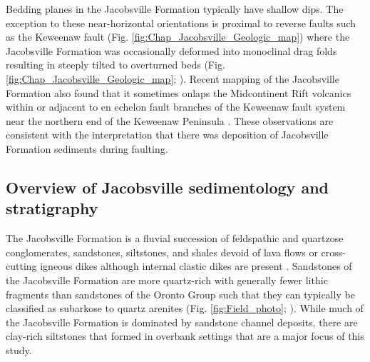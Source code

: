 Bedding planes in the Jacobsville Formation typically have shallow dips. The exception to these near-horizontal orientations is proximal to reverse faults such as the Keweenaw fault (Fig. \ref{fig:Chap_Jacobsville_Geologic_map}) where the Jacobsville Formation was occasionally deformed into monoclinal drag folds resulting in steeply tilted to overturned beds (Fig. \ref{fig:Chap_Jacobsville_Geologic_map}; \cite{Irving1885a, Cannon2001a}). Recent mapping of the Jacobsville Formation also found that it sometimes onlaps the Midcontinent Rift volcanics within or adjacent to en echelon fault branches of the Keweenaw fault system near the northern end of the Keweenaw Peninsula \citep{Tyrrell2019a, Mueller2021a}. These observations are consistent with the interpretation that there was deposition of Jacobsville Formation sediments during faulting.

\subsection*{Overview of Jacobsville sedimentology and stratigraphy}

The Jacobsville Formation is a fluvial succession of feldspathic and quartzose conglomerates, sandstones, siltstones, and shales devoid of lava flows or cross-cutting igneous dikes although internal clastic dikes are present \citep{Hamblin1958a}. Sandstones of the Jacobsville Formation are more quartz-rich with generally fewer lithic fragments than sandstones of the Oronto Group such that they can typically be classified as subarkose to quartz arenites (Fig. \ref{fig:Field_photo}; \cite{Hamblin1958a, Ojakangas2002a}). While much of the Jacobsville Formation is dominated by sandstone channel deposits, there are clay-rich siltstones that formed in overbank settings that are a major focus of this study.

